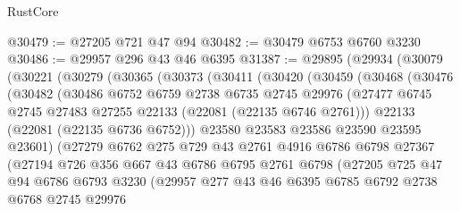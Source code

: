 \begin{lexlean}{RustCore}
\begin{coremodule}
@30479 := @27205 @721 @47 @94
@30482 := @30479 @6753 @6760 @3230
@30486 := @29957 @296 @43 @46 @6395
@31387 := @29895
    (@29934
      (@30079
        (@30221
          (@30279
            (@30365
              (@30373
                (@30411
                  (@30420
                    (@30459
                      (@30468
                        (@30476
                          (@30482
                            (@30486
                              @6752
                              @6759
                              @2738
                              @6735
                              @2745
                              @29976
                              (@27477
                                @6745
                                @2745
                                @27483
                                @27255
                                @22133
                                (@22081 (@22135 @6746 @2761)))
                              @22133
                              (@22081 (@22135 @6736 @6752)))
                            @23580
                            @23583
                            @23586
                            @23590
                            @23595
                            @23601)
                          (@27279
                            @6762
                            @275
                            @729
                            @43
                            @2761
                            @4916
                            @6786
                            @6798
                            @27367
                            (@27194
                              @726
                              @356
                              @667
                              @43
                              @6786
                              @6795
                              @2761
                              @6798
                              (@27205
                                @725
                                @47
                                @94
                                @6786
                                @6793
                                @3230
                                (@29957
                                  @277
                                  @43
                                  @46
                                  @6395
                                  @6785
                                  @6792
                                  @2738
                                  @6768
                                  @2745
                                  @29976

\end{coremodule}
\end{lexlean}
